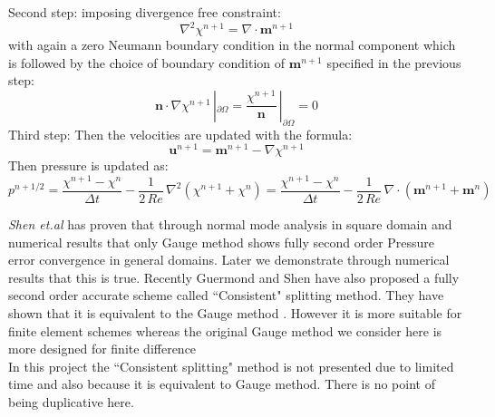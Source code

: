 Second step: imposing divergence free constraint:
\begin{equation*}
\nabla^2\chi^{n+1} = \nabla \cdot \textbf{m}^{n+1}
\end{equation*}
with again a zero Neumann boundary condition in the normal component which is followed by the choice of boundary condition of $\textbf{m}^{n+1}$ specified in the previous step:
\begin{equation*}
\textbf{n} \cdot \nabla \chi^{n+1}\,|_{\partial \Omega}  = \dfrac{\chi^{n+1}}{\textbf{n}}\,|_{\partial \Omega}  = 0
\end{equation*}
Third step: Then the velocities are updated with the formula:
\begin{equation*}
\textbf{u}^{n+1} = \textbf{m}^{n+1} - \nabla \chi^{n+1}
\end{equation*}
Then pressure is updated as:
\begin{equation*}
p^{n+1/2} = \dfrac{\chi^{n+1} - \chi^n}{\Delta t} - \dfrac{1}{2\,Re}\,\nabla^2(\chi^{n+1} + \chi^n) = \dfrac{\chi^{n+1} - \chi^n}{\Delta t} - \dfrac{1}{2\,Re}\,\nabla \cdot (\textbf{m}^{n+1} + \textbf{m}^n)
\end{equation*}

\emph{Shen et.al} has proven that through normal mode analysis in square domain and numerical results that only Gauge method shows fully second order Pressure error convergence in general domains. Later we demonstrate through numerical results that this is true. Recently Guermond and Shen have also proposed a fully second order accurate scheme called ``Consistent" splitting method. They have shown that it is equivalent to the Gauge method \cite{wong2006consistent,pyo2005normal,guermond2006overview}. However it is more suitable for finite element schemes whereas the original Gauge method we consider here is more designed for finite difference \cite{pyo2005normal}\\

In this project the ``Consistent splitting" method is not presented due to limited time and also because it is equivalent to Gauge method. There is no point of being duplicative here.


